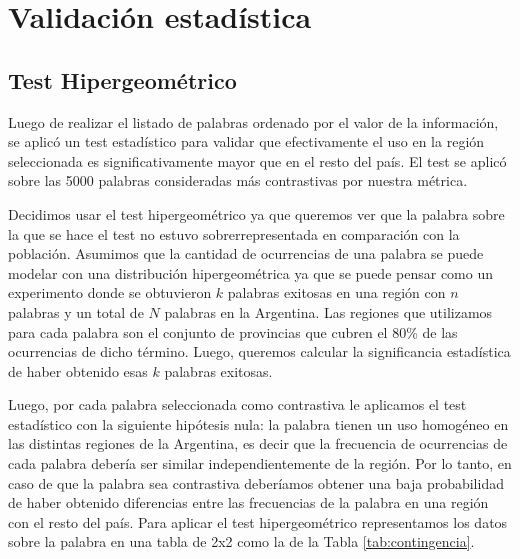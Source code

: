 \section{Validación estadística}
\subsection{Test Hipergeométrico}
Luego de realizar el listado de palabras ordenado por el valor de la información, se aplicó un test estadístico para validar que efectivamente el uso en la región seleccionada es significativamente mayor que en el resto del país. El test se aplicó sobre las 5000 palabras consideradas más contrastivas por nuestra métrica. 


Decidimos usar el test hipergeométrico ya que queremos ver que la palabra sobre la que se hace el test no estuvo sobrerrepresentada en comparación con la población. Asumimos que la cantidad de ocurrencias de una palabra se puede modelar con una distribución hipergeométrica ya que se puede pensar como un experimento donde se obtuvieron $k$ palabras exitosas en una región con $n$ palabras y un total de $N$ palabras en la Argentina. Las regiones que utilizamos para cada palabra son el conjunto de provincias que cubren el 80\% de las ocurrencias de dicho término. Luego, queremos calcular la significancia estadística de haber obtenido esas $k$ palabras exitosas.

Luego, por cada palabra seleccionada como contrastiva le aplicamos el test estadístico con la siguiente hipótesis nula: la palabra tienen un uso homogéneo en las distintas regiones de la Argentina, es decir que la frecuencia de ocurrencias de cada palabra debería ser similar independientemente de la región.
Por lo tanto, en caso de que la palabra sea contrastiva deberíamos obtener una baja probabilidad de haber obtenido diferencias entre las frecuencias de la palabra en una región con el resto del país. 
Para aplicar el test hipergeométrico representamos los datos sobre la palabra en una tabla de 2x2 como la de la Tabla \ref{tab:contingencia}.



